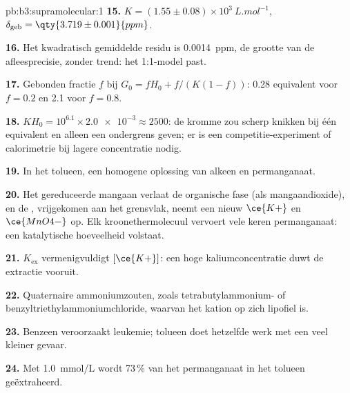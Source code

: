 \begin{solution}{pb:b3:supramolecular:1}
\textbf{15.} $K = (1.55 \pm 0.08) \times 10^3\ \unit{L.mol^{-1}}$, $\delta_{\mathrm{geb}} = \qty{3.719 \pm 0.001}{ppm}$.

\textbf{16.} Het kwadratisch gemiddelde residu is \qty{0.0014}{ppm}, de
grootte van de afleesprecisie, zonder trend: het 1:1-model past.

\textbf{17.} Gebonden fractie $f$ bij $G_0 = fH_0 + f/(K(1 - f))$: 0.28 equivalent voor $f = 0.2$ en 2.1 voor $f = 0.8$.

\textbf{18.} $KH_0 = 10^{6.1} \times \num{2.0e-3} \approx 2500$: de kromme zou scherp knikken bij één equivalent
en alleen een ondergrens geven; er is een competitie-experiment of
calorimetrie bij lagere concentratie nodig.

\textbf{19.} In het tolueen, een homogene oplossing van alkeen en
permanganaat.

\textbf{20.} Het gereduceerde mangaan verlaat de organische fase (als
mangaandioxide), en de , vrijgekomen aan het grensvlak, neemt
een nieuw $\ce{K+}$ en $\ce{MnO4-}$ op. Elk kroonethermolecuul
vervoert vele keren permanganaat: een katalytische hoeveelheid volstaat.

\textbf{21.} $K_{\mathrm{ex}}$ vermenigvuldigt $[\ce{K+}]$: een hoge kaliumconcentratie duwt de extractie vooruit.

\textbf{22.} Quaternaire ammoniumzouten, zoals tetrabutylammonium- of
benzyltriethylammoniumchloride, waarvan het kation op zich lipofiel is.

\textbf{23.} Benzeen veroorzaakt leukemie; tolueen doet hetzelfde werk met
een veel kleiner gevaar.

\textbf{24.} Met \qty{1.0}{mmol/L}  wordt 73\,\% van het
permanganaat in het tolueen geëxtraheerd.
\end{solution}
